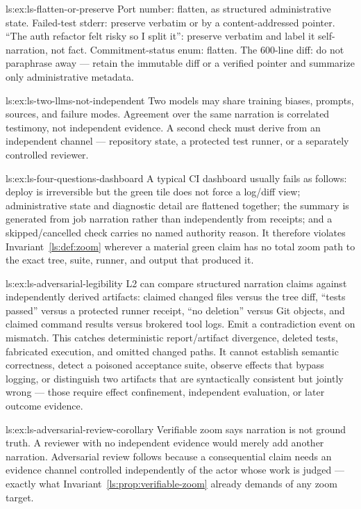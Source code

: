 \begin{pdSolution}{ls:ex:ls-flatten-or-preserve}
Port number: flatten, as structured administrative state. Failed-test stderr: preserve verbatim or by a content-addressed pointer. ``The auth refactor felt risky so I split it'': preserve verbatim and label it self-narration, not fact. Commitment-status enum: flatten. The 600-line diff: do not paraphrase away --- retain the immutable diff or a verified pointer and summarize only administrative metadata.
\end{pdSolution}
\begin{pdSolution}{ls:ex:ls-two-llms-not-independent}
Two models may share training biases, prompts, sources, and failure modes. Agreement over the same narration is correlated testimony, not independent evidence. A second check must derive from an independent channel --- repository state, a protected test runner, or a separately controlled reviewer.
\end{pdSolution}
\begin{pdSolution}{ls:ex:ls-four-questions-dashboard}
A typical CI dashboard usually fails as follows: deploy is irreversible but the green tile does not force a log/diff view; administrative state and diagnostic detail are flattened together; the summary is generated from job narration rather than independently from receipts; and a skipped/cancelled check carries no named authority reason. It therefore violates Invariant~\ref{ls:def:zoom} wherever a material green claim has no total zoom path to the exact tree, suite, runner, and output that produced it.
\end{pdSolution}
\begin{pdSolution}{ls:ex:ls-adversarial-legibility}
L2 can compare structured narration claims against independently derived artifacts: claimed changed files versus the tree diff, ``tests passed'' versus a protected runner receipt, ``no deletion'' versus Git objects, and claimed command results versus brokered tool logs. Emit a contradiction event on mismatch. This catches deterministic report/artifact divergence, deleted tests, fabricated execution, and omitted changed paths. It cannot establish semantic correctness, detect a poisoned acceptance suite, observe effects that bypass logging, or distinguish two artifacts that are syntactically consistent but jointly wrong --- those require effect confinement, independent evaluation, or later outcome evidence.
\end{pdSolution}
\begin{pdSolution}{ls:ex:ls-adversarial-review-corollary}
Verifiable zoom says narration is not ground truth. A reviewer with no independent evidence would merely add another narration. Adversarial review follows because a consequential claim needs an evidence channel controlled independently of the actor whose work is judged --- exactly what Invariant~\ref{ls:prop:verifiable-zoom} already demands of any zoom target.
\end{pdSolution}
